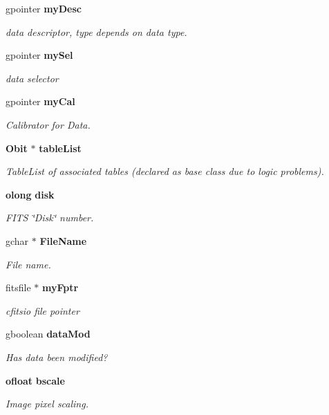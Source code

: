 \begin{CompactItemize}
gpointer {\bf my\-Desc}
\begin{CompactList}\small\item\em data descriptor, type depends on data type. \item\end{CompactList}\item 
gpointer {\bf my\-Sel}
\begin{CompactList}\small\item\em data selector \item\end{CompactList}\item 
gpointer {\bf my\-Cal}
\begin{CompactList}\small\item\em Calibrator for Data. \item\end{CompactList}\item 
{\bf Obit} $\ast$ {\bf table\-List}
\begin{CompactList}\small\item\em Table\-List of associated tables (declared as base class due to logic problems). \item\end{CompactList}\item 
{\bf olong} {\bf disk}
\begin{CompactList}\small\item\em FITS \char`\"{}Disk\char`\"{} number. \item\end{CompactList}\item 
gchar $\ast$ {\bf File\-Name}
\begin{CompactList}\small\item\em File name. \item\end{CompactList}\item 
fitsfile $\ast$ {\bf my\-Fptr}
\begin{CompactList}\small\item\em cfitsio file pointer \item\end{CompactList}\item 
gboolean {\bf data\-Mod}
\begin{CompactList}\small\item\em Has data been modified? \item\end{CompactList}\item 
{\bf ofloat} {\bf bscale}
\begin{CompactList}\small\item\em Image pixel scaling. \item\end{CompactList}\item 

\end{CompactItemize}
